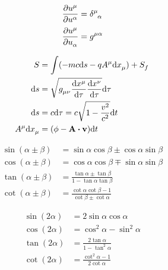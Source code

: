 \documentclass[11pt,twoside]{article}
\begin{document}
\begin{multicols}{3}
\begin{footnotesize}
\begin{equation}
\begin{split}
\pdv{u\indices{^\mu}}{u\indices{^\alpha}}&=\delta\indices{^\mu_\alpha} \\
\pdv{u\indices{^\mu}}{u\indices{_\alpha}}&=g\indices{^{\mu\alpha}}
\end{split}
\end{equation}

\begin{equation}
\begin{split}
S &= \int (-mc\dd s - qA\indices{^\mu}\dd x\indices{_\mu}) + S\indices{_f} \\
\dd s &= \sqrt{g\indices{_{\mu\nu}}\dv{x\indices{^\mu}}{\tau}\dv{x\indices{^\nu}}{\tau}} \dd \tau \\
\dd s &= c \dd \tau = c \sqrt{1-\frac{v^2}{c^2}}\dd t \\
A\indices{^\mu}\dd x\indices{_\mu} &= (\phi - \vb{A}\vdot\vb{v})\dd t
\end{split}
\end{equation}


\begin{equation}
\begin{split}
\sin(\alpha\pm\beta)&=\sin\alpha\cos\beta\pm\cos\alpha\sin\beta \\
\cos(\alpha\pm\beta)&=\cos\alpha\cos\beta\mp\sin\alpha\sin\beta \\
\tan(\alpha\pm\beta)&=\frac{\tan\alpha\pm\tan\beta}{1-\tan\alpha\tan\beta} \\
\cot(\alpha\pm\beta)&=\frac{\cot\alpha\cot\beta-1}{\cot\beta\pm\cot\alpha}
\end{split}
\end{equation}

\begin{equation}
\begin{split}
\sin(2\alpha)&=2\sin\alpha\cos\alpha \\
\cos(2\alpha)&=\cos^2\alpha -\sin^2\alpha \\
\tan(2\alpha)&=\frac{2\tan\alpha}{1-\tan^2\alpha}\\
\cot(2\alpha)&=\frac{\cot^2\alpha - 1}{2\cot\alpha}
\end{split}
\end{equation}


\end{footnotesize}
\end{multicols}
\end{document}

